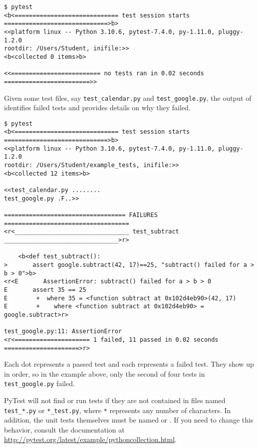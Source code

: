 \begin{lstlisting}
$ pytest
<b<============================= test session starts =============================>b>
<<platform linux -- Python 3.10.6, pytest-7.4.0, py-1.11.0, pluggy-1.2.0
rootdir: /Users/Student, inifile:>>
<b<collected 0 items>b>

<<========================= no tests ran in 0.02 seconds ========================>>
\end{lstlisting}

Given some test files, say \texttt{test\_calendar.py} and \texttt{test\_google.py}, the output of  identifies failed tests and provides details on why they failed.

\begin{lstlisting}
$ pytest
<b<============================= test session starts =============================>b>
<<platform linux -- Python 3.10.6, pytest-7.4.0, py-1.11.0, pluggy-1.2.0
rootdir: /Users/Student/example_tests, inifile:>>
<b<collected 12 items>b>

<<test_calendar.py ........
test_google.py .F..>>

================================== FAILURES ===================================
<r<________________________________ test_subtract ________________________________>r>

    <b<def test_subtract():
>       assert google.subtract(42, 17)==25, "subtract() failed for a > b > 0">b>
<r<E       AssertionError: subtract() failed for a > b > 0
E       assert 35 == 25
E        +  where 35 = <function subtract at 0x102d4eb90>(42, 17)
E        +    where <function subtract at 0x102d4eb90> = google.subtract>r>

test_google.py:11: AssertionError
<r<===================== 1 failed, 11 passed in 0.02 seconds =====================>r>
\end{lstlisting}

Each dot represents a passed test and each  represents a failed test. %
They show up in order, so in the example above, only the second of four tests in \texttt{test\_google.py} failed.

\begin{warn} %
PyTest will not find or run tests if they are not contained in files named \texttt{test\_*.py} or \texttt{*\_test.py}, where \texttt{*} represents any number of characters.
In addition, the unit tests themselves must be named  or .
If you need to change this behavior, consult the documentation at \url{http://pytest.org/latest/example/pythoncollection.html}.
\end{warn}

